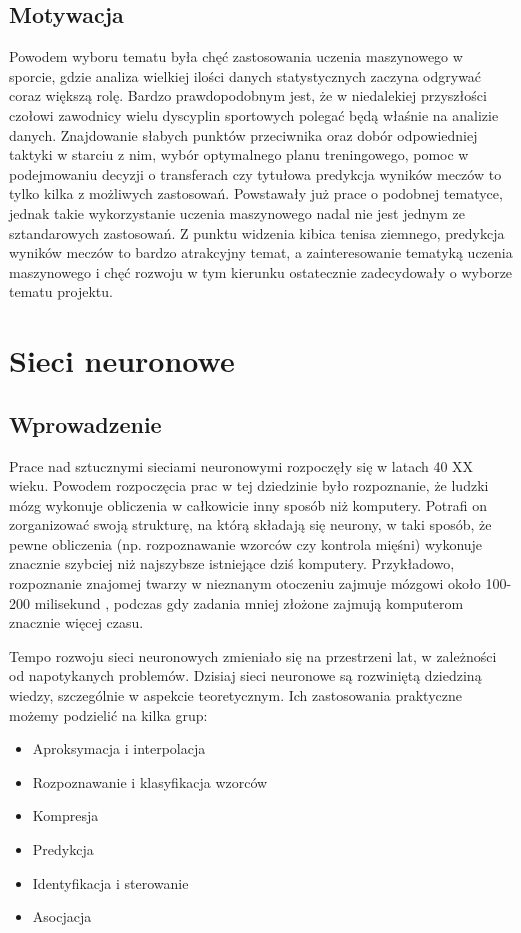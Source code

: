 \section{Motywacja}
\label{Sec:Motiv}
Powodem wyboru tematu była chęć zastosowania uczenia maszynowego w sporcie, gdzie analiza wielkiej ilości danych statystycznych zaczyna odgrywać coraz większą rolę. Bardzo prawdopodobnym jest, że w niedalekiej przyszłości czołowi zawodnicy wielu dyscyplin sportowych polegać będą właśnie na analizie danych. Znajdowanie słabych punktów przeciwnika oraz dobór odpowiedniej taktyki w starciu z nim, wybór optymalnego planu treningowego, pomoc w podejmowaniu decyzji o transferach czy tytułowa predykcja wyników meczów to tylko kilka z możliwych zastosowań.  Powstawały już prace o podobnej tematyce, jednak takie wykorzystanie uczenia maszynowego nadal nie jest jednym ze sztandarowych zastosowań. Z punktu widzenia kibica tenisa ziemnego, predykcja wyników meczów to bardzo atrakcyjny temat, a zainteresowanie tematyką uczenia maszynowego i chęć rozwoju w tym kierunku ostatecznie zadecydowały o wyborze tematu projektu.


\chapter{Sieci neuronowe}
\section{Wprowadzenie}
\label{Sec:ThIntro}
Prace nad sztucznymi sieciami neuronowymi rozpoczęły się w latach 40 XX wieku.\cite{osow01} Powodem rozpoczęcia prac w tej dziedzinie było rozpoznanie, że ludzki mózg wykonuje obliczenia w całkowicie inny sposób niż komputery. Potrafi on zorganizować swoją strukturę, na którą składają się neurony, w taki sposób, że pewne obliczenia (np. rozpoznawanie wzorców czy kontrola mięśni) wykonuje znacznie szybciej niż najszybsze istniejące dziś komputery. Przykładowo, rozpoznanie znajomej twarzy w nieznanym otoczeniu zajmuje mózgowi około 100-200 milisekund \cite{hayk01}, podczas gdy zadania mniej złożone zajmują komputerom znacznie więcej czasu. 

Tempo rozwoju sieci neuronowych zmieniało się na przestrzeni lat, w zależności od napotykanych problemów. Dzisiaj sieci neuronowe są rozwiniętą dziedziną wiedzy, szczególnie w aspekcie teoretycznym\cite{osow01}. Ich zastosowania praktyczne możemy podzielić na kilka grup:
\begin{itemize}
\item Aproksymacja i interpolacja
\item Rozpoznawanie i klasyfikacja wzorców
\item Kompresja
\item Predykcja
\item Identyfikacja i sterowanie
\item Asocjacja
\end{itemize}

